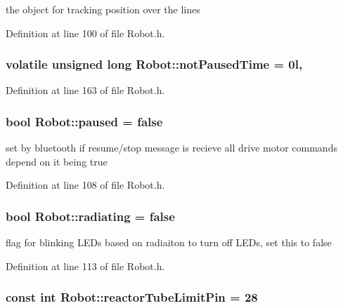 the object for tracking position over the lines 



Definition at line 100 of file Robot.\-h.

\hypertarget{classRobot_a4eb9957add77241230cdf010b4eced16}{
\subsubsection[{not\-Paused\-Time}]{\setlength{\rightskip}{0pt plus 5cm}volatile unsigned long Robot\-::not\-Paused\-Time = 0l\hspace{0.3cm}{\ttfamily [static]}, {\ttfamily [private]}}}\label{classRobot_a4eb9957add77241230cdf010b4eced16}


Definition at line 163 of file Robot.\-h.

\hypertarget{classRobot_a6a1fae6e6ee0a3298b9e60d3f50ad12a}{
\subsubsection[{paused}]{\setlength{\rightskip}{0pt plus 5cm}bool Robot\-::paused = false\hspace{0.3cm}{\ttfamily [static]}}}\label{classRobot_a6a1fae6e6ee0a3298b9e60d3f50ad12a}


set by bluetooth if resume/stop message is recieve all drive motor commands depend on it being true 



Definition at line 108 of file Robot.\-h.

\hypertarget{classRobot_a77f62d85ab1cf34e79c2a3acd470a4ce}{
\subsubsection[{radiating}]{\setlength{\rightskip}{0pt plus 5cm}bool Robot\-::radiating = false}}\label{classRobot_a77f62d85ab1cf34e79c2a3acd470a4ce}


flag for blinking L\-E\-Ds based on radiaiton to turn off L\-E\-Ds, set this to false 



Definition at line 113 of file Robot.\-h.

\hypertarget{classRobot_a351d754436c8f569432ef7a06641f98a}{
\subsubsection[{reactor\-Tube\-Limit\-Pin}]{\setlength{\rightskip}{0pt plus 5cm}const int Robot\-::reactor\-Tube\-Limit\-Pin = 28\hspace{0.3cm}{\ttfamily [private]}}}\label{classRobot_a351d754436c8f569432ef7a06641f98a}


